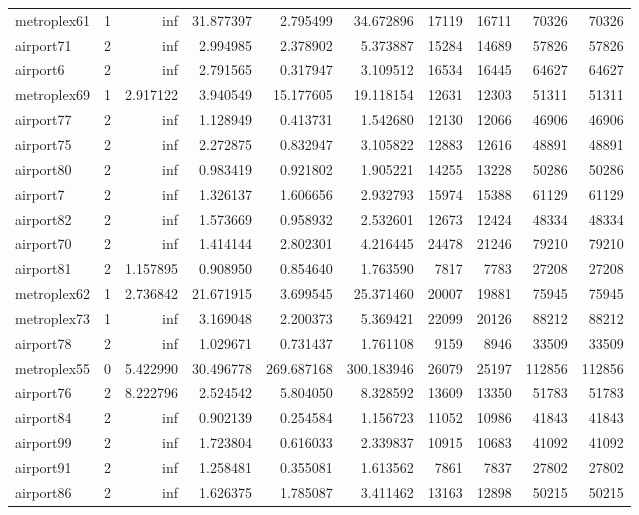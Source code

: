 \begin{longtable}{|l|r|r|r|r|r|r|r|r|r|}
metroplex61 & 1 & inf & 31.877397 & 2.795499 & 34.672896 & 17119 & 16711 & 70326 & 70326 \\
airport71 & 2 & inf & 2.994985 & 2.378902 & 5.373887 & 15284 & 14689 & 57826 & 57826 \\
airport6 & 2 & inf & 2.791565 & 0.317947 & 3.109512 & 16534 & 16445 & 64627 & 64627 \\
metroplex69 & 1 & 2.917122 & 3.940549 & 15.177605 & 19.118154 & 12631 & 12303 & 51311 & 51311 \\
airport77 & 2 & inf & 1.128949 & 0.413731 & 1.542680 & 12130 & 12066 & 46906 & 46906 \\
airport75 & 2 & inf & 2.272875 & 0.832947 & 3.105822 & 12883 & 12616 & 48891 & 48891 \\
airport80 & 2 & inf & 0.983419 & 0.921802 & 1.905221 & 14255 & 13228 & 50286 & 50286 \\
airport7 & 2 & inf & 1.326137 & 1.606656 & 2.932793 & 15974 & 15388 & 61129 & 61129 \\
airport82 & 2 & inf & 1.573669 & 0.958932 & 2.532601 & 12673 & 12424 & 48334 & 48334 \\
airport70 & 2 & inf & 1.414144 & 2.802301 & 4.216445 & 24478 & 21246 & 79210 & 79210 \\
airport81 & 2 & 1.157895 & 0.908950 & 0.854640 & 1.763590 & 7817 & 7783 & 27208 & 27208 \\
metroplex62 & 1 & 2.736842 & 21.671915 & 3.699545 & 25.371460 & 20007 & 19881 & 75945 & 75945 \\
metroplex73 & 1 & inf & 3.169048 & 2.200373 & 5.369421 & 22099 & 20126 & 88212 & 88212 \\
airport78 & 2 & inf & 1.029671 & 0.731437 & 1.761108 & 9159 & 8946 & 33509 & 33509 \\
metroplex55 & 0 & 5.422990 & 30.496778 & 269.687168 & 300.183946 & 26079 & 25197 & 112856 & 112856 \\
airport76 & 2 & 8.222796 & 2.524542 & 5.804050 & 8.328592 & 13609 & 13350 & 51783 & 51783 \\
airport84 & 2 & inf & 0.902139 & 0.254584 & 1.156723 & 11052 & 10986 & 41843 & 41843 \\
airport99 & 2 & inf & 1.723804 & 0.616033 & 2.339837 & 10915 & 10683 & 41092 & 41092 \\
airport91 & 2 & inf & 1.258481 & 0.355081 & 1.613562 & 7861 & 7837 & 27802 & 27802 \\
airport86 & 2 & inf & 1.626375 & 1.785087 & 3.411462 & 13163 & 12898 & 50215 & 50215 \\

\end{longtable}
